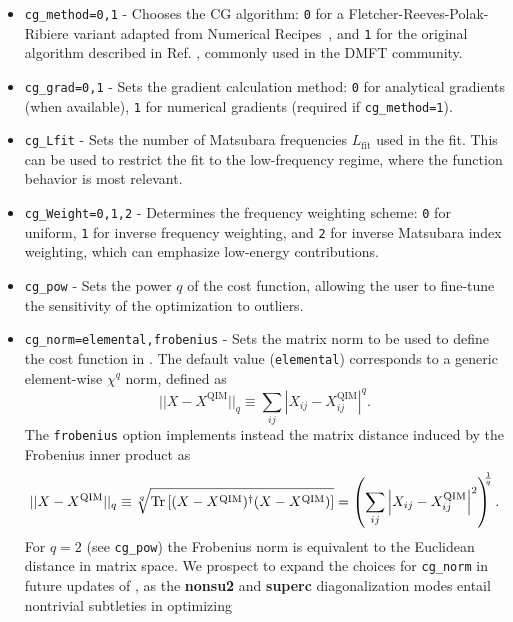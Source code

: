 \documentclass[edipack2.tex]{subfiles}
\begin{document}
\begin{itemize}
\item \texttt{cg\_method=0,1} - Chooses the CG algorithm: 
\texttt{0} for a Fletcher-Reeves-Polak-Ribiere variant adapted from 
Numerical Recipes~\cite{NumRec77}, and \texttt{1} for the original 
algorithm described in Ref. \cite{Georges1996RMP}, commonly used 
in the DMFT community.
\item \texttt{cg\_grad=0,1} - Sets the gradient calculation method: 
\texttt{0} for analytical gradients (when available), \texttt{1} for 
numerical gradients (required if \texttt{cg\_method=1}).
\item \texttt{cg\_Lfit} - Sets the number of Matsubara frequencies 
$L_\mathrm{fit}$ used in the fit. This can be used to restrict the 
fit to the low-frequency regime, where the function behavior is 
most relevant.
\item \texttt{cg\_Weight=0,1,2} - Determines the frequency weighting 
scheme: \texttt{0} for uniform, \texttt{1} for inverse frequency 
weighting, and \texttt{2} for inverse Matsubara index weighting, which 
can emphasize low-energy contributions.
\item \texttt{cg\_pow} - Sets the power $q$ of the cost function, 
allowing the user to fine-tune the sensitivity of the optimization 
to outliers.
\item \texttt{cg\_norm=elemental,frobenius} - Sets the matrix norm to be used to define the cost function in . The default value (\texttt{elemental}) corresponds to a generic element-wise $\chi^q$ norm, defined as 
\begin{equation*}
    ||X-X^\mathrm{QIM}||_q \equiv {\sum_{ij} \left|X_{ij}-X^\mathrm{QIM}_{ij}\right|^q}.
\end{equation*}
The \texttt{frobenius} option implements instead the matrix distance induced by the Frobenius inner product as
\begin{equation*}
    ||X-X^\mathrm{QIM}||_q \equiv 
    \sqrt[q]{{\rm Tr}\left[(X-X^\mathrm{QIM})^\dagger(X-X^\mathrm{QIM})\right]} =
    \left(\sum_{ij} \left|X_{ij}-X^\mathrm{QIM}_{ij}\right|^2 \right)^{\!\!\!\frac{1}{q}}.
\end{equation*}
For $q=2$ (see \texttt{cg\_pow}) the Frobenius norm is equivalent
to the Euclidean distance in matrix space. 
We prospect to expand the choices for \texttt{cg\_norm} in future updates of \NAME, as the \textbf{nonsu2} and \textbf{superc}
diagonalization modes entail nontrivial subtleties in optimizing 

\end{itemize}
\end{document}
